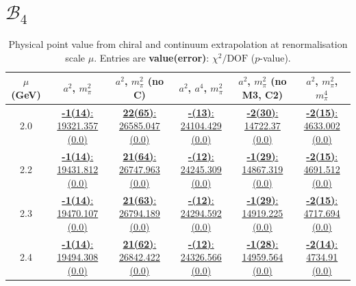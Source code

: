\documentclass[12pt]{extarticle}
\begin{document}
\section{$\mathcal{B}_4$}
\begin{table}[h!]
\begin{center}
\begin{tabular}{|c|c|c|c|c|c|}
\hline
$\mu$ (GeV) & $a^2$, $m_\pi^2$& $a^2$, $m_\pi^2$ (no C)& $a^2$, $a^4$, $m_\pi^2$& $a^2$, $m_\pi^2$ (no M3, C2)& $a^2$, $m_\pi^2$, $m_\pi^4$\\
\hline
2.0& \hyperlink{SSpPP/NPR/a2m2_20.pdf.1}{\textbf{-1(14)}: 19321.357 (0.0)} & \hyperlink{SSpPP/NPR/a2m2noC_20.pdf.1}{\textbf{22(65)}: 26585.047 (0.0)} & \hyperlink{SSpPP/NPR/a2a4m2_20.pdf.1}{\textbf{-(13)}: 24104.429 (0.0)} & \hyperlink{SSpPP/NPR/a2m2mcut_20.pdf.1}{\textbf{-2(30)}: 14722.37 (0.0)} & \hyperlink{SSpPP/NPR/a2m2m4_20.pdf.1}{\textbf{-2(15)}: 4633.002 (0.0)}\\
2.2& \hyperlink{SSpPP/NPR/a2m2_22.pdf.1}{\textbf{-1(14)}: 19431.812 (0.0)} & \hyperlink{SSpPP/NPR/a2m2noC_22.pdf.1}{\textbf{21(64)}: 26747.963 (0.0)} & \hyperlink{SSpPP/NPR/a2a4m2_22.pdf.1}{\textbf{-(12)}: 24245.309 (0.0)} & \hyperlink{SSpPP/NPR/a2m2mcut_22.pdf.1}{\textbf{-1(29)}: 14867.319 (0.0)} & \hyperlink{SSpPP/NPR/a2m2m4_22.pdf.1}{\textbf{-2(15)}: 4691.512 (0.0)}\\
2.3& \hyperlink{SSpPP/NPR/a2m2_23.pdf.1}{\textbf{-1(14)}: 19470.107 (0.0)} & \hyperlink{SSpPP/NPR/a2m2noC_23.pdf.1}{\textbf{21(63)}: 26794.189 (0.0)} & \hyperlink{SSpPP/NPR/a2a4m2_23.pdf.1}{\textbf{-(12)}: 24294.592 (0.0)} & \hyperlink{SSpPP/NPR/a2m2mcut_23.pdf.1}{\textbf{-1(29)}: 14919.225 (0.0)} & \hyperlink{SSpPP/NPR/a2m2m4_23.pdf.1}{\textbf{-2(15)}: 4717.694 (0.0)}\\
2.4& \hyperlink{SSpPP/NPR/a2m2_24.pdf.1}{\textbf{-1(14)}: 19494.308 (0.0)} & \hyperlink{SSpPP/NPR/a2m2noC_24.pdf.1}{\textbf{21(62)}: 26842.422 (0.0)} & \hyperlink{SSpPP/NPR/a2a4m2_24.pdf.1}{\textbf{-(12)}: 24326.566 (0.0)} & \hyperlink{SSpPP/NPR/a2m2mcut_24.pdf.1}{\textbf{-1(28)}: 14959.564 (0.0)} & \hyperlink{SSpPP/NPR/a2m2m4_24.pdf.1}{\textbf{-2(14)}: 4734.91 (0.0)}\\
\hline
\end{tabular}
\caption{Physical point value from chiral and continuum extrapolation at renormalisation scale $\mu$. Entries are \textbf{value(error)}: $\chi^2/\text{DOF}$ ($p$-value).}
\end{center}
\end{table}
\end{document}
